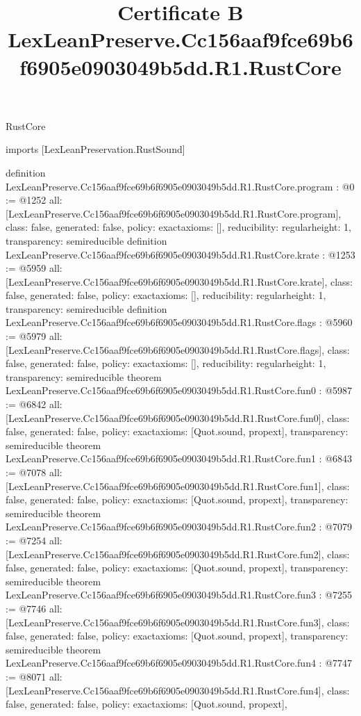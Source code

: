 \begin{lexlean}{RustCore}
\title{Certificate B LexLeanPreserve.Cc156aaf9fce69b6f6905e0903049b5dd.R1.RustCore}
\begin{coremodule}
imports [LexLeanPreservation.RustSound]

definition LexLeanPreserve.Cc156aaf9fce69b6f6905e0903049b5dd.R1.RustCore.program : @0 := @1252 {
  all: [LexLeanPreserve.Cc156aaf9fce69b6f6905e0903049b5dd.R1.RustCore.program],
  class: false,
  generated: false,
  policy: exact{axioms: []},
  reducibility: regular{height: 1},
  transparency: semireducible
}
definition LexLeanPreserve.Cc156aaf9fce69b6f6905e0903049b5dd.R1.RustCore.krate : @1253 := @5959 {
  all: [LexLeanPreserve.Cc156aaf9fce69b6f6905e0903049b5dd.R1.RustCore.krate],
  class: false,
  generated: false,
  policy: exact{axioms: []},
  reducibility: regular{height: 1},
  transparency: semireducible
}
definition LexLeanPreserve.Cc156aaf9fce69b6f6905e0903049b5dd.R1.RustCore.flags : @5960 := @5979 {
  all: [LexLeanPreserve.Cc156aaf9fce69b6f6905e0903049b5dd.R1.RustCore.flags],
  class: false,
  generated: false,
  policy: exact{axioms: []},
  reducibility: regular{height: 1},
  transparency: semireducible
}
theorem LexLeanPreserve.Cc156aaf9fce69b6f6905e0903049b5dd.R1.RustCore.fun0 : @5987 := @6842 {
  all: [LexLeanPreserve.Cc156aaf9fce69b6f6905e0903049b5dd.R1.RustCore.fun0],
  class: false,
  generated: false,
  policy: exact{axioms: [Quot.sound, propext]},
  transparency: semireducible
}
theorem LexLeanPreserve.Cc156aaf9fce69b6f6905e0903049b5dd.R1.RustCore.fun1 : @6843 := @7078 {
  all: [LexLeanPreserve.Cc156aaf9fce69b6f6905e0903049b5dd.R1.RustCore.fun1],
  class: false,
  generated: false,
  policy: exact{axioms: [Quot.sound, propext]},
  transparency: semireducible
}
theorem LexLeanPreserve.Cc156aaf9fce69b6f6905e0903049b5dd.R1.RustCore.fun2 : @7079 := @7254 {
  all: [LexLeanPreserve.Cc156aaf9fce69b6f6905e0903049b5dd.R1.RustCore.fun2],
  class: false,
  generated: false,
  policy: exact{axioms: [Quot.sound, propext]},
  transparency: semireducible
}
theorem LexLeanPreserve.Cc156aaf9fce69b6f6905e0903049b5dd.R1.RustCore.fun3 : @7255 := @7746 {
  all: [LexLeanPreserve.Cc156aaf9fce69b6f6905e0903049b5dd.R1.RustCore.fun3],
  class: false,
  generated: false,
  policy: exact{axioms: [Quot.sound, propext]},
  transparency: semireducible
}
theorem LexLeanPreserve.Cc156aaf9fce69b6f6905e0903049b5dd.R1.RustCore.fun4 : @7747 := @8071 {
  all: [LexLeanPreserve.Cc156aaf9fce69b6f6905e0903049b5dd.R1.RustCore.fun4],
  class: false,
  generated: false,
  policy: exact{axioms: [Quot.sound, propext]},
}
\end{coremodule}
\end{lexlean}
